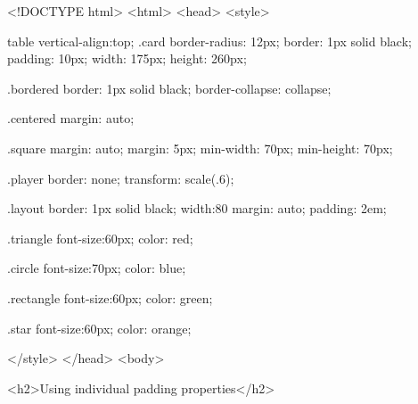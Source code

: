<!DOCTYPE html>
<html>
<head>
<style>

table{
vertical-align:top;}
.card {
	border-radius: 12px;
    border: 1px solid black;
    padding: 10px;
    width: 175px;
    height: 260px;
}

.bordered {
    border: 1px solid black;
    border-collapse: collapse;
}

.centered {
	margin: auto;
}

.square {
    margin: auto;
    margin: 5px;
    min-width: 70px;
    min-height: 70px;
}

.player {
    border: none;
    transform: scale(.6);
}

.layout {
    border: 1px solid black;
	width:80%
    margin: auto;
    padding: 2em;
}

.triangle {
	font-size:60px;
    color: red;
}

.circle {
	font-size:70px;
    color: blue;
}

.rectangle {
	font-size:60px;
    color: green;
}

.star {
	font-size:60px;
    color: orange;
}

</style>
</head>
<body>

<h2>Using individual padding properties</h2>

